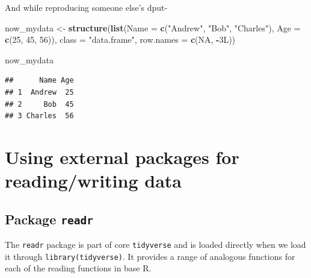 \documentclass[
]{book}
\newenvironment{Shaded}{\begin{snugshade}}{\end{snugshade}}
\newcommand{\AttributeTok}[1]{\textcolor[rgb]{0.13,0.29,0.53}{#1}}
\newcommand{\ConstantTok}[1]{\textcolor[rgb]{0.56,0.35,0.01}{#1}}
\newcommand{\DecValTok}[1]{\textcolor[rgb]{0.00,0.00,0.81}{#1}}
\newcommand{\FunctionTok}[1]{\textcolor[rgb]{0.13,0.29,0.53}{\textbf{#1}}}
\newcommand{\NormalTok}[1]{#1}
\newcommand{\OtherTok}[1]{\textcolor[rgb]{0.56,0.35,0.01}{#1}}
\newcommand{\SpecialCharTok}[1]{\textcolor[rgb]{0.81,0.36,0.00}{\textbf{#1}}}
\newcommand{\StringTok}[1]{\textcolor[rgb]{0.31,0.60,0.02}{#1}}
\begin{document}
And while reproducing someone else's dput-

\begin{Shaded}
\begin{Highlighting}[]
\NormalTok{now\_mydata }\OtherTok{\textless{}{-}} \FunctionTok{structure}\NormalTok{(}\FunctionTok{list}\NormalTok{(}\AttributeTok{Name =} \FunctionTok{c}\NormalTok{(}\StringTok{"Andrew"}\NormalTok{, }\StringTok{"Bob"}\NormalTok{, }\StringTok{"Charles"}\NormalTok{), }\AttributeTok{Age =} \FunctionTok{c}\NormalTok{(}\DecValTok{25}\NormalTok{, }
\DecValTok{45}\NormalTok{, }\DecValTok{56}\NormalTok{)), }\AttributeTok{class =} \StringTok{"data.frame"}\NormalTok{, }\AttributeTok{row.names =} \FunctionTok{c}\NormalTok{(}\ConstantTok{NA}\NormalTok{, }\SpecialCharTok{{-}}\NormalTok{3L))}

\NormalTok{now\_mydata}
\end{Highlighting}
\end{Shaded}

\begin{verbatim}
##      Name Age
## 1  Andrew  25
## 2     Bob  45
## 3 Charles  56
\end{verbatim}

\hypertarget{using-external-packages-for-readingwriting-data}{%
\section{Using external packages for reading/writing data}\label{using-external-packages-for-readingwriting-data}}

\hypertarget{package-readr}{%
\subsection{\texorpdfstring{Package \texttt{readr}}{Package readr}}\label{package-readr}}

The \texttt{readr} package \citep{R-readr} is part of core \texttt{tidyverse} and is loaded directly when we load it through \texttt{library(tidyverse)}. It provides a range of analogous functions for each of the reading functions in base R.
\end{document}
